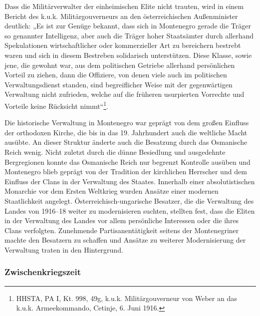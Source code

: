 Dass die Militärverwalter der einheimischen Elite nicht trauten, wird in einem Bericht des k.u.k. Militärgouverneurs an den österreichischen Außenminister deutlich: „Es ist zur Genüge bekannt, dass sich in Montenegro gerade die Träger so genannter Intelligenz, aber auch die Träger hoher Staatsämter durch allerhand Spekulationen wirtschaftlicher oder kommerzieller Art zu bereichern bestrebt waren und sich in diesem Bestreben solidarisch unterstützen. Diese Klasse, sowie jene, die gewohnt war, aus dem politischen Getriebe allerhand persönlichen Vorteil zu ziehen, dann die Offiziere, von denen viele auch im politischen Verwaltungsdienst standen, sind begreiflicher Weise mit der gegenwärtigen Verwaltung nicht zufrieden, welche auf die früheren usurpierten Vorrechte und Vorteile keine Rücksicht nimmt“\footnote{HHSTA, PA I, Kt. 998, 49g, k.u.k. Militärgouverneur von Weber an das k.u.k. Armeekommando, Cetinje, 6. Juni 1916.}. \par
Die historische Verwaltung in Montenegro war geprägt von dem großen Einfluss der orthodoxen Kirche, die bis in das 19. Jahrhundert auch die weltliche Macht ausübte. An dieser Struktur änderte auch die Besatzung durch das Osmanische Reich wenig. Nicht zuletzt durch die dünne Besiedlung und ausgedehnte Bergregionen konnte das Osmanische Reich nur begrenzt Kontrolle ausüben und Montenegro blieb geprägt von der Tradition der kirchlichen Herrscher und dem Einfluss der Clans in der Verwaltung des Staates. Innerhalb einer absolutistischen Monarchie vor dem Ersten Weltkrieg wurden Ansätze einer modernen Staatlichkeit angelegt. Österreichisch-ungarische Besatzer, die die Verwaltung des Landes von 1916–18 weiter zu modernisieren suchten, stellten fest, dass die Eliten in der Verwaltung des Landes vor allem persönliche Interessen oder die ihres Clans verfolgten. Zunehmende Partisanentätigkeit seitens der Montenegriner machte den Besatzern zu schaffen und Ansätze zu weiterer Modernisierung der Verwaltung traten in den Hintergrund.

\subsubsection{Zwischenkriegszeit}

